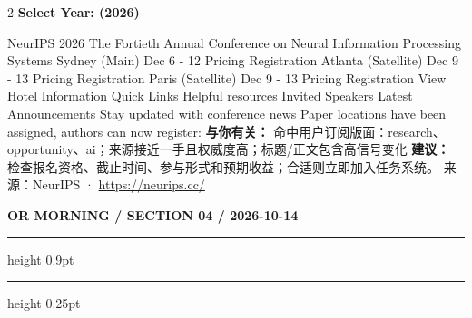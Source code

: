 \documentclass[10.5pt]{ctexart}
\begin{document}
\begin{multicols}{2}
\vspace{2mm}
{\large\bfseries Select Year: (2026)}\par
NeurIPS 2026 The Fortieth Annual Conference on Neural Information Processing Systems Sydney (Main) Dec 6 - 12 Pricing Registration Atlanta (Satellite) Dec 9 - 13 Pricing Registration Paris (Satellite) Dec 9 - 13 Pricing Registration View Hotel Information Quick Links Helpful resources Invited Speakers Latest Announcements Stay updated with conference news Paper locations have been assigned, authors can now register: 
\textbf{与你有关：} 命中用户订阅版面：research、opportunity、ai；来源接近一手且权威度高；标题/正文包含高信号变化
\textbf{建议：} 检查报名资格、截止时间、参与形式和预期收益；合适则立即加入任务系统。
{\footnotesize\color{ormuted} 来源：NeurIPS · \url{https://neurips.cc/}}
\end{multicols}
\newpage
{\small\bfseries OR MORNING / SECTION 04 / 2026-10-14}
\vspace{2mm}
\hrule height 0.9pt
\vspace{1.5mm}
\hrule height 0.25pt
\vspace{4mm}
\end{document}
